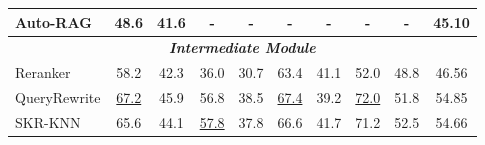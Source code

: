 \begin{table*}[t]
{\begin{tabular}{@{}lccccccccc@{}}
\multicolumn{1}{l|}{Auto-RAG}                                                                         & 48.6                            & \multicolumn{1}{c|}{41.6}                                                    & -                               & \multicolumn{1}{c|}{-}                                                       & -                               & \multicolumn{1}{c|}{-}                                                       & -                               & \multicolumn{1}{c|}{-}                                                       & 45.10                              \\ \midrule
\multicolumn{10}{c}{\textit{\textbf{Intermediate Module}}}                                                                                                                                                                                                                                                                                                                                                                                                                                                                                                                                                     \\ \midrule
\multicolumn{1}{l|}{Reranker}                                                                         & 58.2                            & \multicolumn{1}{c|}{42.3}                                                    & 36.0                            & \multicolumn{1}{c|}{30.7}                                                    & 63.4                            & \multicolumn{1}{c|}{41.1}                                                    & 52.0                            & \multicolumn{1}{c|}{48.8}                                                    & 46.56                              \\
\multicolumn{1}{l|}{QueryRewrite}                                                                     & \underline{67.2}                & \multicolumn{1}{c|}{45.9}                                                    & 56.8                            & \multicolumn{1}{c|}{38.5}                                                    & \underline{67.4}                & \multicolumn{1}{c|}{39.2}                                                    & \underline{72.0}                & \multicolumn{1}{c|}{51.8}                                                    & 54.85                              \\
\multicolumn{1}{l|}{SKR-KNN}                                                                          & 65.6                            & \multicolumn{1}{c|}{44.1}                                                    & \underline{57.8}                & \multicolumn{1}{c|}{37.8}                                                    & 66.6                            & \multicolumn{1}{c|}{41.7}                                                    & 71.2                            & \multicolumn{1}{c|}{52.5}                                                    & 54.66                              \\

\end{tabular}}
\end{table*}
